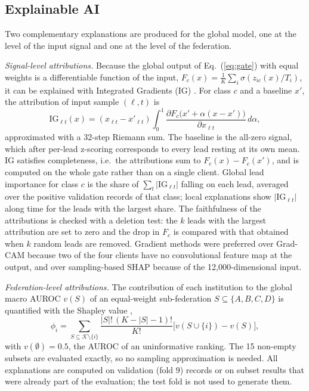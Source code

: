 \subsection{Explainable AI}
\label{sec:xai-method}

Two complementary explanations are produced for the global model, one at the level of the input
signal and one at the level of the federation.

\textit{Signal-level attributions.} Because the global output of Eq.~(\ref{eq:gate}) with equal
weights is a differentiable function of the input, $F_c(x)=\frac{1}{K}\sum_i\sigma(z_{ic}(x)/T_i)$,
it can be explained with Integrated Gradients (IG) \cite{sundararajan2017ig}. For class $c$ and a
baseline $x'$, the attribution of input sample $(\ell,t)$ is
\begin{equation}
\mathrm{IG}_{\ell t}(x)=(x_{\ell t}-x'_{\ell t})\int_{0}^{1}\frac{\partial F_c\big(x'+\alpha(x-x')\big)}{\partial x_{\ell t}}\,d\alpha,
\end{equation}
approximated with a 32-step Riemann sum. The baseline is the all-zero signal, which after per-lead
z-scoring corresponds to every lead resting at its own mean. IG satisfies completeness, i.e.\ the
attributions sum to $F_c(x)-F_c(x')$, and is computed on the whole gate rather than on a single
client. Global lead importance for class $c$ is the share of $\sum_t|\mathrm{IG}_{\ell t}|$ falling on
each lead, averaged over the positive validation records of that class; local explanations show
$|\mathrm{IG}_{\ell t}|$ along time for the leads with the largest share. The faithfulness of the
attributions is checked with a deletion test: the $k$ leads with the largest attribution are set to
zero and the drop in $F_c$ is compared with that obtained when $k$ random leads are removed. Gradient
methods were preferred over Grad-CAM \cite{selvaraju2017gradcam} because two of the four clients have
no convolutional feature map at the output, and over sampling-based SHAP \cite{lundberg2017shap}
because of the 12{,}000-dimensional input.

\textit{Federation-level attributions.} The contribution of each institution to the global macro
AUROC $v(S)$ of an equal-weight sub-federation $S\subseteq\{A,B,C,D\}$ is quantified with the Shapley
value \cite{shapley1953},
\begin{equation}
\phi_i=\sum_{S\subseteq\mathcal{K}\setminus\{i\}}\frac{|S|!\,(K-|S|-1)!}{K!}\big[v(S\cup\{i\})-v(S)\big],
\end{equation}
with $v(\emptyset)=0.5$, the AUROC of an uninformative ranking. The 15 non-empty subsets are evaluated
exactly, so no sampling approximation is needed. All explanations are computed on validation (fold 9)
records or on subset results that were already part of the evaluation; the test fold is not used to
generate them.
